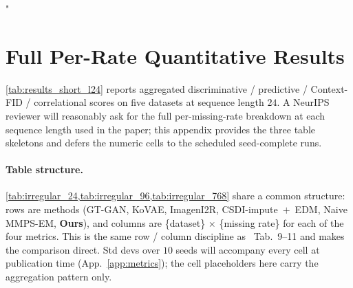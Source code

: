 "\documentclass{article}
\theoremstyle{plain}
\theoremstyle{definition}
\theoremstyle{remark}
\begin{document}
\section{Full Per-Rate Quantitative Results}
\label{app:full-results}

\cref{tab:results_short_l24} reports aggregated discriminative / predictive / Context-FID / correlational scores on five datasets at sequence length $24$. A NeurIPS reviewer will reasonably ask for the full per-missing-rate breakdown at each sequence length used in the paper; this appendix provides the three table skeletons and defers the numeric cells to the scheduled seed-complete runs.

\paragraph{Table structure.}
\cref{tab:irregular_24,tab:irregular_96,tab:irregular_768} share a common structure: rows are methods (GT-GAN, KoVAE, ImagenI2R, CSDI-impute~$+$~EDM, Naive MMPS-EM, \textbf{Ours}), and columns are \{dataset\} $\times$ \{missing rate\} for each of the four metrics. This is the same row / column discipline as~\citet{fadlon2025imageni2r} Tab.~9--11 and makes the comparison direct. Std devs over $10$ seeds will accompany every cell at publication time (App.~\ref{app:metrics}); the cell placeholders here carry the aggregation pattern only.
\end{document}
